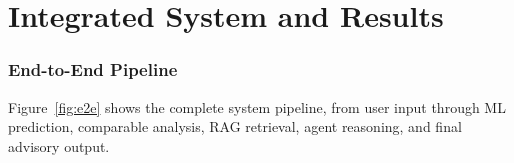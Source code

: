 \documentclass[11pt,a4paper]{article}
\begin{document}
\newpage

\part{Integrated System and Results}

\section{End-to-End Pipeline}

Figure~\ref{fig:e2e} shows the complete system pipeline, from user input through ML prediction, comparable analysis, RAG retrieval, agent reasoning, and final advisory output.
\end{document}
